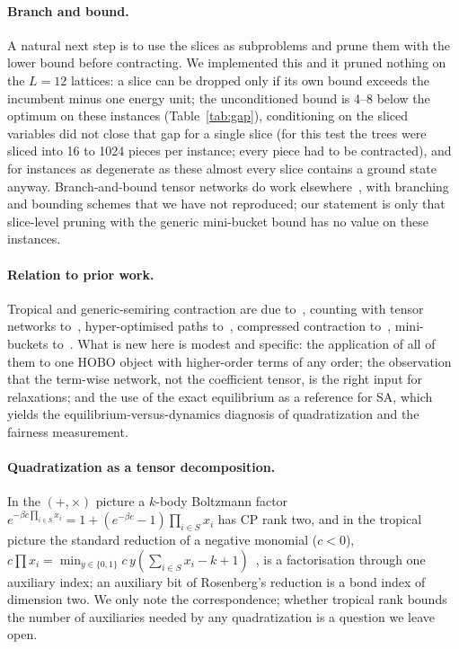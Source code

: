 \documentclass{article}
\begin{document}
\paragraph{Branch and bound.} A natural next step is to use the slices as subproblems and prune them with the lower bound before contracting. We implemented this and it pruned nothing on the $L=12$ lattices: a slice can be dropped only if its own bound exceeds the incumbent minus one energy unit; the unconditioned bound is 4--8 below the optimum on these instances (Table~\ref{tab:gap}), conditioning on the sliced variables did not close that gap for a single slice (for this test the trees were sliced into 16 to 1024 pieces per instance; every piece had to be contracted), and for instances as degenerate as these almost every slice contains a ground state anyway. Branch-and-bound tensor networks do work elsewhere~\cite{wang2026bbtn,smierzchalski2025spinglasspeps,rams2021approximate}, with branching and bounding schemes that we have not reproduced; our statement is only that slice-level pruning with the generic mini-bucket bound has no value on these instances.

\paragraph{Relation to prior work.} Tropical and generic-semiring contraction are due to~\cite{liu2021tropical,liu2023generic,gao2025guide}, counting with tensor networks to~\cite{kourtis2019fast}, hyper-optimised paths to~\cite{gray2021hyper}, compressed contraction to~\cite{pan2020contracting,gray2024hyperoptimized}, mini-buckets to~\cite{dechter2003minibuckets}. What is new here is modest and specific: the application of all of them to one HOBO object with higher-order terms of any order; the observation that the term-wise network, not the coefficient tensor, is the right input for relaxations; and the use of the exact equilibrium as a reference for SA, which yields the equilibrium-versus-dynamics diagnosis of quadratization and the fairness measurement.

\paragraph{Quadratization as a tensor decomposition.} In the $(+,\times)$ picture a $k$-body Boltzmann factor $e^{-\beta c\prod_{i\in S}x_i}=1+(e^{-\beta c}-1)\prod_{i\in S}x_i$ has CP rank two, and in the tropical picture the standard reduction of a negative monomial ($c<0$), $c\prod x_i=\min_{y\in\{0,1\}} c\,y(\sum_{i\in S}x_i-k+1)$~\cite{freedman2005energy}, is a factorisation through one auxiliary index; an auxiliary bit of Rosenberg's reduction is a bond index of dimension two. We only note the correspondence; whether tropical rank bounds the number of auxiliaries needed by any quadratization is a question we leave open.
\end{document}
